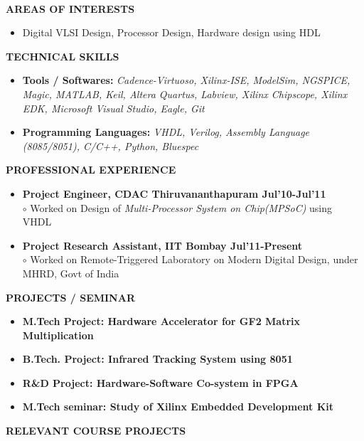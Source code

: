 \documentclass[a4paper,10pt]{article}
\begin{document}
\paragraph{}
\textbf{ }
\vspace{2.1in}

 \hspace{-0.2in}\colorbox{titleColor}{\parbox{6.5in}{\textbf{AREAS OF INTERESTS}}}
 \begin{itemize}
  \setlength{\itemsep}{1pt}
  \item {{  Digital VLSI Design, Processor Design, Hardware design using HDL}}
 \end{itemize}
 \colorbox{titleColor}{\parbox{6.5in}{\textbf{TECHNICAL SKILLS}}}
 \begin{itemize}
  \setlength{\itemsep}{1pt}
  \item \textbf{{Tools / Softwares:}} \textit{Cadence-Virtuoso, Xilinx-ISE, ModelSim, NGSPICE, Magic, MATLAB, Keil, Altera Quartus, Labview, Xilinx Chipscope, Xilinx EDK, Microsoft Visual Studio, Eagle, Git}
  \item \textbf{{Programming Languages:}} \textit{VHDL, Verilog, Assembly Language (8085/8051), C/C++, Python, Bluespec}
 \end{itemize}
  \colorbox{titleColor}{\parbox{6.5in}{\textbf{PROFESSIONAL EXPERIENCE}}}
  \begin{itemize}
  \item \textbf{Project Engineer, CDAC Thiruvananthapuram \qquad\qquad\qquad\quad\qquad\qquad\qquad Jul'10-Jul'11}\\
  $\circ$  Worked on  Design of \textit{Multi-Processor System on Chip(MPSoC)} using VHDL
  \item \textbf{Project Research Assistant, IIT Bombay 	\qquad\qquad\qquad\qquad\quad\qquad\qquad\qquad Jul'11-Present}\\
  $\circ$ Worked on Remote-Triggered Laboratory on Modern Digital Design, under MHRD, Govt of India\\
  \end{itemize}
 \colorbox{titleColor}{\parbox{6.5in}{\textbf{PROJECTS / SEMINAR}}}
 \begin{itemize}
 \item \textbf{M.Tech Project: Hardware Accelerator for GF2 Matrix Multiplication } 
  \item \textbf{{B.Tech. Project: Infrared Tracking System using 8051}}  %
  \item \textbf{{R\&D Project: Hardware-Software Co-system in FPGA}}
  \item \textbf{{M.Tech seminar: Study of Xilinx Embedded Development Kit}}
 \end{itemize}
 \colorbox{titleColor}{\parbox{6.5in}{\textbf{RELEVANT COURSE PROJECTS}}}
\end{document}
